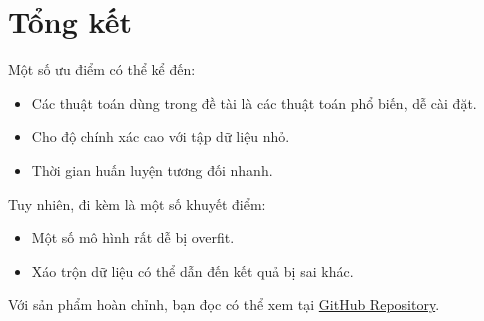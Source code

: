\documentclass[12pt]{article}
\begin{document}
\section{Tổng kết}
Một số ưu điểm có thể kể đến:
\begin{itemize}
\item Các thuật toán dùng trong đề tài là các thuật toán phổ biến, dễ cài đặt.
\item Cho độ chính xác cao với tập dữ liệu nhỏ.
\item Thời gian huấn luyện tương đối nhanh.
\end{itemize}
Tuy nhiên, đi kèm là một số khuyết điểm:
\begin{itemize}
\item Một số mô hình rất dễ bị overfit.
\item Xáo trộn dữ liệu có thể dẫn đến kết quả bị sai khác.\cite{Kowsari_2019}
\end{itemize}
Với sản phẩm hoàn chỉnh, bạn đọc có thể xem tại \href{https://github.com/trhgquan/fakenews-detection}{GitHub Repository}.

\cleardoublepage
{}
{}


\end{document}
